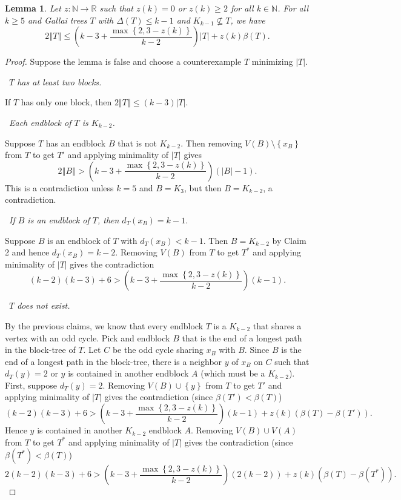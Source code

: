 \documentclass[10pt]{article}
\theoremstyle{plain}
\newtheorem{lem}[thm]{Lemma}
\theoremstyle{definition}
\theoremstyle{remark}
\newcommand{\IN}{\mathbb{N}}
\newcommand{\IR}{\mathbb{R}}
\newcommand{\set}[1]{\left\{ #1 \right\}}
\newcommand{\card}[1]{\left|#1\right|}
\newcommand{\size}[1]{\left\Vert#1\right\Vert}
\newcommand{\func}[3]{#1\colon #2 \rightarrow #3}
\newcommand{\parens}[1]{\left( #1 \right)}
\newcommand{\claim}[2]{{\bf Claim #1.}~{\it #2}~~}
\begin{document}
\begin{lem}\label{nokkm1}
	Let $\func{z}{\IN}{\IR}$ such that $z(k) = 0$ or $z(k) \ge 2$ for all $k \in \IN$.
	For all $k \ge 5$ and Gallai trees $T$ with $\Delta(T) \le k-1$ and $K_{k-1} \not \subseteq T$, we have
	\[2\size{T} \le \parens{k-3 + \frac{\max\set{2, 3-z(k)}}{k-2}}\card{T} + z(k)\beta(T).\]
\end{lem}
\begin{proof}
Suppose the lemma is false and choose a counterexample $T$ minimizing $\card{T}$.  

\noindent\claim{1}{$T$ has at least two blocks.}

If $T$ has only one block, then $2\size{T} \le \parens{k-3}\card{T}$.

\noindent\claim{2}{Each endblock of $T$ is $K_{k-2}$.}

Suppose $T$ has an endblock $B$ that is not $K_{k-2}$. Then removing $V(B)\setminus\set{x_B}$ from $T$ to get $T'$ and applying minimality of $\card{T}$ gives
\[2\size{B} > \parens{k-3 + \frac{\max\set{2, 3-z(k)}}{k-2}}\parens{\card{B} - 1}.\]
This is a contradiction unless $k=5$ and $B = K_3$, but then $B = K_{k-2}$, a contradiction.

\noindent\claim{3}{If $B$ is an endblock of $T$, then $d_T(x_B) = k-1$.}

Suppose $B$ is an endblock of $T$ with $d_T(x_B) < k-1$.  Then $B = K_{k-2}$ by Claim 2 and hence $d_T(x_B) = k-2$.  Removing $V(B)$ from $T$ to get $T^*$ and applying minimality of $\card{T}$ gives
the contradiction
\[(k-2)(k-3) + 6 > \parens{k-3 + \frac{\max\set{2, 3-z(k)}}{k-2}}\parens{k-1}.\]

\noindent\claim{4}{$T$ does not exist.}

By the previous claims, we know that every endblock $T$ is a $K_{k-2}$ that shares a vertex with an odd cycle.  Pick and endblock $B$ that is the end of a
longest path in the block-tree of $T$.  Let $C$ be the odd cycle sharing $x_B$ with $B$.  Since $B$ is the end of a longest path in the block-tree, there is
a neighbor $y$ of $x_B$ on $C$ such that $d_T(y) = 2$ or $y$ is contained in another endblock $A$ (which must be a $K_{k-2}$).  
First, suppose $d_T(y) = 2$.
Removing $V(B) \cup \set{y}$ from $T$ to get $T'$ and applying minimality of $\card{T}$ gives the contradiction (since $\beta(T') < \beta(T)$)
\[(k-2)(k-3) + 6 > \parens{k-3 + \frac{\max\set{2, 3-z(k)}}{k-2}}\parens{k-1} + z(k)(\beta(T) - \beta(T')).\]
Hence $y$ is contained in another $K_{k-2}$ endblock $A$.  Removing $V(B) \cup V(A)$ from $T$ to get $T^*$ and applying minimality of $\card{T}$ gives
the contradiction (since $\beta(T^*) < \beta(T)$)
\[2(k-2)(k-3) + 6 > \parens{k-3 + \frac{\max\set{2, 3-z(k)}}{k-2}}\parens{2(k-2)} + z(k)(\beta(T) - \beta(T^*)).\]
\end{proof}
\end{document}
